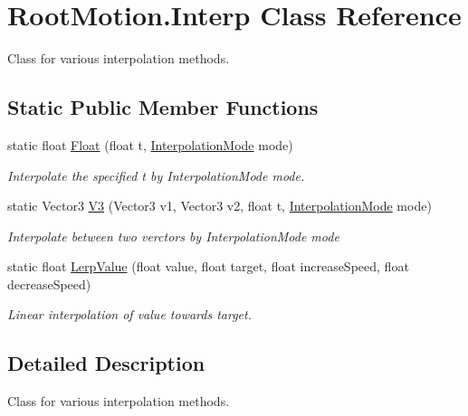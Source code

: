 \hypertarget{class_root_motion_1_1_interp}{}\section{Root\+Motion.\+Interp Class Reference}
\label{class_root_motion_1_1_interp}


Class for various interpolation methods.  


\subsection*{Static Public Member Functions}
\begin{DoxyCompactItemize}
\item 
static float \mbox{\hyperlink{class_root_motion_1_1_interp_abae271011391a41e77fcb3a526baafc3}{Float}} (float t, \mbox{\hyperlink{namespace_root_motion_ab1cbf9354347d1a3d238c06200006b9f}{Interpolation\+Mode}} mode)
\begin{DoxyCompactList}\small\item\em Interpolate the specified t by Interpolation\+Mode mode. \end{DoxyCompactList}\item 
static Vector3 \mbox{\hyperlink{class_root_motion_1_1_interp_af692b44d59d139a46ff419dfceea9d63}{V3}} (Vector3 v1, Vector3 v2, float t, \mbox{\hyperlink{namespace_root_motion_ab1cbf9354347d1a3d238c06200006b9f}{Interpolation\+Mode}} mode)
\begin{DoxyCompactList}\small\item\em Interpolate between two verctors by Interpolation\+Mode mode \end{DoxyCompactList}\item 
static float \mbox{\hyperlink{class_root_motion_1_1_interp_ad69af8ecf172f7e7a2a6594ade2b9a48}{Lerp\+Value}} (float value, float target, float increase\+Speed, float decrease\+Speed)
\begin{DoxyCompactList}\small\item\em Linear interpolation of value towards target. \end{DoxyCompactList}\end{DoxyCompactItemize}


\subsection{Detailed Description}
Class for various interpolation methods. 



